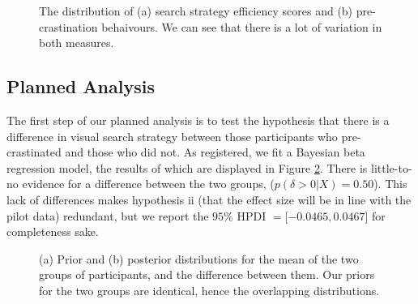 \documentclass[]{rsos}
\begin{document}
\begin{figure}[t]
  \centering  
  \caption{The distribution of (a) search strategy efficiency scores and (b) pre-crastination behaivours. We can see that there is a lot of variation in both measures. }
  \label{fig:exp2_strat_summary}
\end{figure}

\subsection{Planned Analysis}

The first step of our planned analysis is to test the hypothesis that there is a difference in  visual search strategy between those participants who pre-crastinated and those who did not. As registered, we fit a Bayesian beta regression model, the results of which are displayed in Figure \ref{fig:full_exp_strategy}. There is little-to-no evidence for a difference between the two groups, ($p(\delta >0| X)  =0.50$). This lack of differences makes hypothesis ii (that the effect size will be in line with the pilot data) redundant, but we report the $95\%$ HPDI $= [-0.0465, 0.0467$] for completeness sake.

\begin{figure}[t]
  \centering  
  \caption{(a) Prior and (b) posterior distributions for the mean of the two groups of participants, and the difference between them. Our priors for the two groups are identical, hence the overlapping distributions.}
  \label{fig:full_exp_strategy}
\end{figure}
\end{document}
